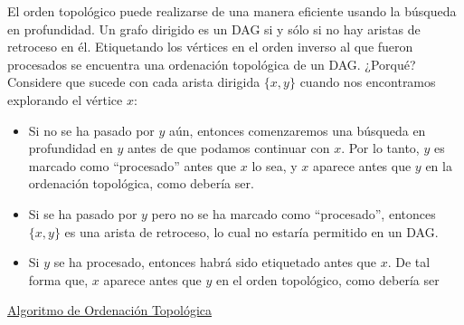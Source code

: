 El orden topológico puede realizarse de una manera eficiente usando la búsqueda en profundidad. Un grafo dirigido es un DAG si y sólo si no hay aristas de retroceso en él. Etiquetando los vértices en el orden inverso al que fueron procesados se encuentra una ordenación topológica de un DAG. ¿Porqué? Considere que sucede con cada arista dirigida $\{x,y\}$ cuando nos encontramos explorando el vértice $x$:

\begin{itemize}
\item Si no se ha pasado por $y$ aún, entonces comenzaremos una búsqueda en profundidad en $y$ antes de que podamos continuar con $x$. Por lo tanto, $y$ es marcado como ``procesado'' antes que $x$ lo sea, y $x$ aparece antes que $y$ en la ordenación topológica, como debería ser.
\item Si se ha pasado por $y$ pero no se ha marcado como ``procesado'', entonces $\{x,y\}$ es una arista de retroceso, lo cual no estaría permitido en un DAG.
\item Si $y$ se ha procesado, entonces habrá sido etiquetado antes que $x$. De tal forma que, $x$ aparece antes que $y$ en el orden topológico, como debería ser
\end{itemize}

\underline{Algoritmo de Ordenación Topológica}\\

